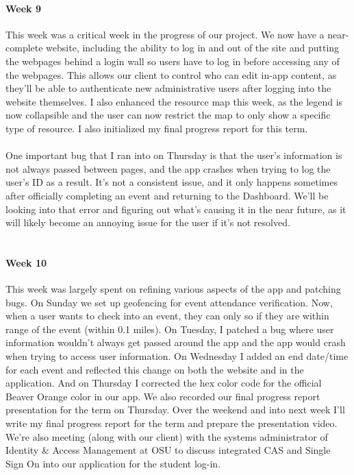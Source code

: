 \documentclass[onecolumn, draftclsnofoot,10pt, compsoc]{IEEEtran}
\begin{document}
      \paragraph{Week 9}
      This week was a critical week in the progress of our project. We now have a near-complete website, including the ability to log in and out of the site and putting the webpages behind a login wall so users have to log in before accessing any of the webpages. This allows our client to control who can edit in-app content, as they'll be able to authenticate new administrative users after logging into the website themselves. I also enhanced the resource map this week, as the legend is now collapsible and the user can now restrict the map to only show a specific type of resource. I also initialized my final progress report for this term. \\ \\
      One important bug that I ran into on Thursday is that the user's information is not always passed between pages, and the app crashes when trying to log the user's ID as a result. It's not a consistent issue, and it only happens sometimes after officially completing an event and returning to the Dashboard. We'll be looking into that error and figuring out what's causing it in the near future, as it will likely become an annoying issue for the user if it's not resolved. \\ \\

      \paragraph{Week 10}
      This week was largely spent on refining various aspects of the app and patching bugs. On Sunday we set up geofencing for event attendance verification. Now, when a user wants to check into an event, they can only so if they are within range of the event (within 0.1 miles). On Tuesday, I patched a bug where user information wouldn't always get passed around the app and the app would crash when trying to access user information. On Wednesday I added an end date/time for each event and reflected this change on both the website and in the application. And on Thursday I corrected the hex color code for the official Beaver Orange color in our app. We also recorded our final progress report presentation for the term on Thursday. Over the weekend and into next week I'll write my final progress report for the term and prepare the presentation video. We're also meeting (along with our client) with the systems administrator of Identity \& Access Management at OSU to discuss integrated CAS and Single Sign On into our application for the student log-in. \\ \\
\end{document}
